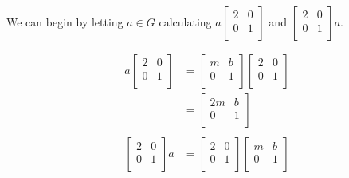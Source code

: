 \begin{mdframed}[style=darkAnswer,frametitle={Joe Starr}]
  We can begin by letting $a\in G$ calculating $a\begin{bmatrix}
      2 & 0 \\
      0 & 1 \\
    \end{bmatrix}$ and $\begin{bmatrix}
      2 & 0 \\
      0 & 1 \\
    \end{bmatrix}a$.
  \begin{multicols}{2}
    \begin{align*}
      a\begin{bmatrix}
        2 & 0 \\
        0 & 1 \\
      \end{bmatrix} & = \begin{bmatrix}
        m & b \\
        0 & 1 \\
      \end{bmatrix} \begin{bmatrix}
        2 & 0 \\
        0 & 1 \\
      \end{bmatrix} \\
                                  & = \begin{bmatrix}
        2m & b \\
        0  & 1 \\
      \end{bmatrix}                            \\
    \end{align*}
    \begin{align*}
      \begin{bmatrix}
        2 & 0 \\
        0 & 1 \\
      \end{bmatrix}a & =  \begin{bmatrix}
        2 & 0 \\
        0 & 1 \\
      \end{bmatrix} \begin{bmatrix}
        m & b \\
        0 & 1 \\
      \end{bmatrix} \\

\end{align*}
\end{multicols}
\end{mdframed}
